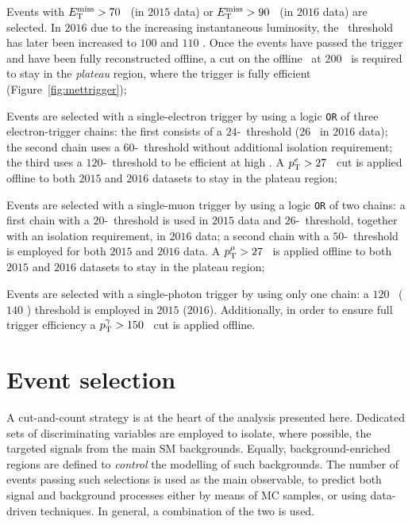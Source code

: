		Events with $E_{\mathrm{T}}^{\mathrm{miss}} > 70$ \GeV\ (in $2015$ data) or $E_{\mathrm{T}}^{\mathrm{miss}} > 90$ \GeV\ (in $2016$ data) are selected. In $2016$ due to the increasing instantaneous luminosity, the \met\ threshold has later been increased to $100$ and $110$ \GeV. Once the events have passed the trigger and have been fully reconstructed offline, a cut on the offline \met\ at $200$ \GeV\ is required to stay in the \emph{plateau} region, where the trigger is fully efficient (Figure~\ref{fig:mettrigger});

		Events are selected with a single-electron trigger by using a logic \texttt{OR} of three electron-trigger chains: the first consists of a $24$-\GeV\ threshold ($26$ \GeV\ in $2016$ data); the second chain uses a $60$-\GeV\ threshold without additional isolation requirement; the third uses a $120$-\GeV\ threshold to be efficient at high \et. A $p_{\mathrm{T}}^e > 27$ \GeV\ cut is applied offline to both $2015$ and $2016$ datasets to stay in the plateau region;

		Events are selected with a single-muon trigger by using a logic \texttt{OR} of two chains: a first chain with a $20$-\GeV\ threshold is used in $2015$ data and $26$-\GeV\ threshold, together with an isolation requirement, in $2016$ data; a second chain with a $50$-\GeV\ threshold is employed for both $2015$ and $2016$ data. A $p_{\mathrm{T}}^\mu > 27$ \GeV\ is applied offline to both $2015$ and $2016$ datasets to stay in the plateau region;

		Events are selected with a single-photon trigger by using only one chain: a $120$ \GeV\ ($140$ \GeV) threshold is employed in $2015$ ($2016$). Additionally, in order to ensure full trigger efficiency a $p_{\mathrm{T}}^\gamma > 150$ \GeV\ cut is applied offline.


	\section{Event selection}
	\label{sec:evtsel}

		A cut-and-count strategy is at the heart of the analysis presented here. Dedicated sets of discriminating variables are employed to isolate, where possible, the targeted signals from the main \ac{SM} backgrounds. Equally, background-enriched regions are defined to \emph{control} the modelling of such backgrounds. The number of events passing such selections is used as the main observable, to predict both signal and background processes either by means of \ac{MC} samples, or using data-driven techniques. In general, a combination of the two is used. 

